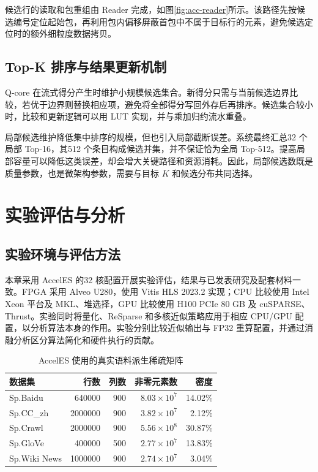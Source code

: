 候选行的读取和包重组由 Reader 完成，如图\ref{fig:acc-reader}所示。该路径先按候选编号定位起始包，再利用包内偏移屏蔽首包中不属于目标行的元素，避免候选定位时的额外细粒度数据拷贝。


\subsection{Top-K 排序与结果更新机制}
Q-core 在流式得分产生时维护小规模候选集合。新得分只需与当前候选边界比较，若优于边界则替换相应项，避免将全部得分写回外存后再排序。候选集合较小时，比较和更新逻辑可以用 LUT 实现，并与乘加归约流水重叠。

局部候选维护降低集中排序的规模，但也引入局部截断误差。系统最终汇总32 个局部 Top-16，其512 个条目构成候选并集，并不保证恰为全局 Top-512。提高局部容量可以降低这类误差，却会增大关键路径和资源消耗。因此，局部候选数既是质量参数，也是微架构参数，需要与目标 $K$ 和候选分布共同选择。

\section{实验评估与分析}
\subsection{实验环境与评估方法}
本章采用 AccelES 的32 核配置开展实验评估，结果与已发表研究及配套材料一致\cite{jqzhai2025AccelES}。FPGA 采用 Alveo U280，使用 Vitis HLS 2023.2 实现；CPU 比较使用 Intel Xeon 平台及 MKL、堆选择，GPU 比较使用 H100 PCIe 80 GB 及 cuSPARSE、Thrust。实验同时将量化、ReSparse 和多核近似策略应用于相应 CPU/GPU 配置，以分析算法本身的作用。实验分别比较近似输出与 FP32 重算配置，并通过消融分析区分算法简化和硬件执行的贡献。

\begin{table}[htbp]\centering
\caption{AccelES 使用的真实语料派生稀疏矩阵}\label{tab:acc-data}
\begin{tabular}{lrrrr}\toprule
数据集&行数&列数&非零元素数&密度\\\midrule
Sp.Baidu&640000&900&$8.03\times10^7$&14.02\%\\
Sp.CC\_zh&2000000&900&$3.82\times10^7$&2.12\%\\
Sp.Crawl&2000000&900&$5.56\times10^8$&30.87\%\\
Sp.GloVe&400000&500&$2.77\times10^7$&13.83\%\\
Sp.Wiki News&1000000&900&$2.74\times10^7$&3.04\%\\\bottomrule
\end{tabular}
\end{table}

